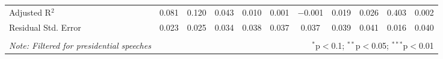 \begin{table}[!htbp]
\begin{adjustbox}{width=1.35\textwidth}
\begin{tabular}{@{\extracolsep{5pt}}lcccccccccc}
Adjusted R$^{2}$ & 0.081 & 0.120 & 0.043 & 0.010 & 0.001 & $-$0.001 & 0.019 & 0.026 & 0.403 & 0.002 \\ 
Residual Std. Error & 0.023 & 0.025 & 0.034 & 0.038 & 0.037 & 0.037 & 0.039 & 0.041 & 0.016 & 0.040 \\ 
\hline 
\hline \\[-1.8ex] 
\textit{Note: Filtered for presidential speeches}  & \multicolumn{10}{r}{$^{*}$p$<$0.1; $^{**}$p$<$0.05; $^{***}$p$<$0.01} \\ 
\end{tabular} 
\end{adjustbox}
\end{table} 
